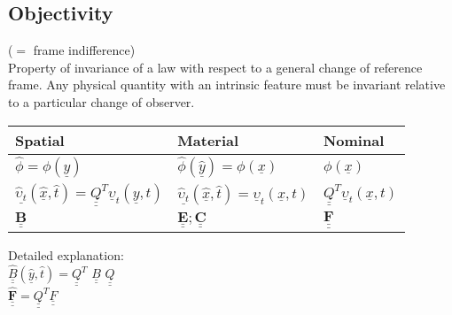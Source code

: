 \subsection*{Objectivity}
($=$ frame indifference) \\
Property of invariance of a law with respect to a general change of reference frame. Any physical quantity with an intrinsic feature must be invariant relative to a particular change of observer.\\



\begin{tabular} {>{\centering\arraybackslash}m{2.7cm}>{\centering\arraybackslash}m{2.8cm}>{\centering\arraybackslash}m{2.7cm}}
\toprule
\textbf{Spatial} & \textbf{Material} & \textbf{Nominal} \\
\midrule
 $\hat{\phi} = \phi(\underline{y}) $ & $ \hat{\phi}(\underline{\hat{y}}) = \phi(\underline{x}) $ & $\phi(\underline{x})$ \\
\midrule

 $\underline{\hat{\upsilon}_t} (\underline{\hat{x}}, \hat{t}) = \underline{\underline{Q}}^T \underline{\upsilon}_t (\underline{y},t)$ & $\underline{\hat{\upsilon}_t} (\underline{\hat{x}}, \hat{t}) = \underline{\upsilon}_t (\underline{x},t)$ & $\underline{\underline{Q}}^T \underline{\upsilon}_t (\underline{x},t) $\\
\midrule
 
$\underline{\underline{\mathbf{B}}}$ & $\underline{\underline{\mathbf{E}}}; \underline{\underline{\mathbf{C}}} $& $ \underline{\underline{\mathbf{F}}}$ \\
\bottomrule
\end{tabular}
\smallskip

Detailed explanation: \\
$\underline{\underline{\hat{B}}} (\underline{\hat{y}}, \hat{t}) = \underline{\underline{Q}}^T $ $ \underline{\underline{B}} $  $\underline{\underline{Q}}$ \\
$ \underline{\underline{\hat{\mathbf{F}}}} = \underline{\underline{Q}}^T \underline{\underline{F}}$

